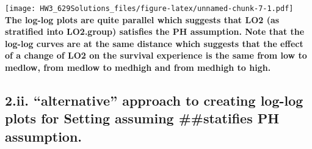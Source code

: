 \documentclass[
]{article}
\newenvironment{Shaded}{\begin{snugshade}}{\end{snugshade}}
\newcommand{\AttributeTok}[1]{\textcolor[rgb]{0.77,0.63,0.00}{#1}}
\newcommand{\CommentTok}[1]{\textcolor[rgb]{0.56,0.35,0.01}{\textit{#1}}}
\newcommand{\DecValTok}[1]{\textcolor[rgb]{0.00,0.00,0.81}{#1}}
\newcommand{\FunctionTok}[1]{\textcolor[rgb]{0.00,0.00,0.00}{#1}}
\newcommand{\NormalTok}[1]{#1}
\newcommand{\OtherTok}[1]{\textcolor[rgb]{0.56,0.35,0.01}{#1}}
\newcommand{\SpecialCharTok}[1]{\textcolor[rgb]{0.00,0.00,0.00}{#1}}
\begin{document}
\texttt{[image: HW3\_629Solutions\_files/figure-latex/unnamed-chunk-7-1.pdf]}
\textbf{The log-log plots are quite parallel which suggests that LO2 (as
stratified into LO2.group) satisfies the PH assumption. Note that the
log-log curves are at the same distance which suggests that the effect
of a change of LO2 on the survival experience is the same from low to
medlow, from medlow to medhigh and from medhigh to high.}

\hypertarget{ii.-alternative-approach-to-creating-log-log-plots-for-setting-assuming-statifies-ph-assumption.}{%
\subsection{2.ii. ``alternative'' approach to creating log-log plots for
Setting assuming \#\#statifies PH
assumption.}\label{ii.-alternative-approach-to-creating-log-log-plots-for-setting-assuming-statifies-ph-assumption.}}

\begin{Shaded}
\end{Shaded}
\end{document}
